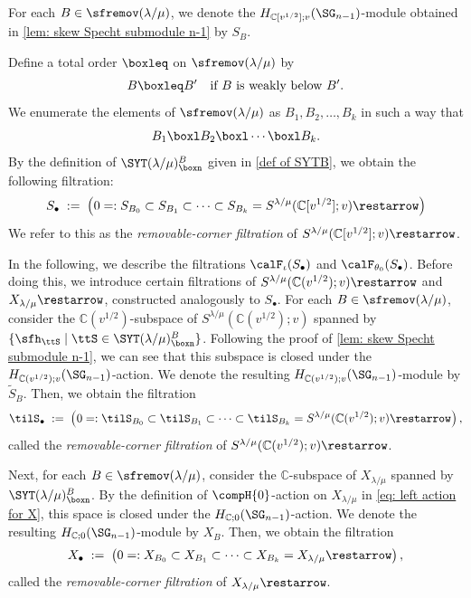 \documentclass[12pt, reqno]{amsart}
\theoremstyle{plain}
\theoremstyle{definition}
\numberwithin{equation}{section}
\numberwithin{figure}{section}
\numberwithin{table}{section}
\def\C{\mathbb C}
\begin{document}
For each $B \in \sfremov(\lambda/\mu)$, we denote the
$H_{\C[v^{1/2}];v}(\SG_{n-1})$-module obtained in
\cref{lem: skew Specht submodule n-1} by
$S_B$. 







Define a total order $\boxleq$ on $\sfremov(\lambda/\mu)$ by
\begin{align}\label{eq: total order condition}
B \boxleq B' \quad \text{if $B$ is weakly below $B'$.}
\end{align}
We enumerate the elements of $\sfremov(\lambda/\mu)$ as $B_1,B_2,\ldots,B_k$ in such a way that
\[
B_1 \boxl B_2 \boxl \cdots \boxl B_k .
\]
By the definition of $\SYT(\lambda/\mu)^B_{\boxn}$ given in \cref{def of SYTB}, we obtain the following filtration:
\begin{align}\label{eq: first remov filt}
S_{\bullet} \; := \;\left(
0 =:S_{B_0} \subset S_{B_1} \subset \cdots 
\subset S_{B_k} = S^{\lambda/\mu}(\C[v^{1/2}];v)\restarrow\right)
\end{align}
We refer to this as the \emph{removable-corner filtration} of $S^{\lambda/\mu}(\C[v^{1/2}];v)\restarrow$.




In the following, we describe 
the filtrations 
$\calF_\iota(S_{\bullet})$ and $\calF_{\theta_0}(S_{\bullet})$.
Before doing this, we introduce
certain filtrations  of $S^{\lambda/\mu}(\C(v^{1/2});v) \restarrow$ and $X_{\lambda/\mu} \restarrow$, constructed analogously to $S_{\bullet}$. 
For each $B \in \sfremov(\lambda/\mu)$, consider the $\C(v^{1/2})$-subspace of $S^{\lambda/\mu}(\C(v^{1/2});v)$ spanned by $\{\sfh_{\ttS} \mid \ttS \in \SYT(\lambda/\mu)^B_{\boxn} \}$.
Following the proof of \cref{lem: skew Specht submodule n-1}, we can see that this subspace  is closed under the $H_{\C(v^{1/2});v}(\SG_{n-1})$-action.
We denote the  resulting $H_{\C(v^{1/2});v}(\SG_{n-1})$-module
 by $\widetilde{S}_B$.
Then, we obtain the filtration
\begin{align}\label{eq: first remov filt}
\tilS_{\bullet} \; := \;\left(
0 =:\tilS_{B_0} \subset \tilS_{B_1} \subset \cdots 
\subset \tilS_{B_k} = S^{\lambda/\mu}(\C(v^{1/2});v)\restarrow\right),
\end{align}
called the
\emph{removable-corner filtration} of $S^{\lambda/\mu}(\C(v^{1/2});v)\restarrow$.

Next, for each $B \in \sfremov(\lambda/\mu)$,  consider the $\C$-subspace of $X_{\lambda/\mu}$ spanned by $\SYT(\lambda/\mu)^{B}_{\boxn}$.
By the definition of $\compH{0}$-action on $X_{\lambda/\mu}$ in \cref{eq: left action for X}, 
this space is closed under the $H_{\C;0}(\SG_{n-1})$-action.
We denote the  resulting $H_{\C;0}(\SG_{n-1})$-module
 by $X_B$.
Then, we obtain the filtration
\begin{align}\label{eq: first remov filt}
X_{\bullet} \; := \;\left(
0 =:X_{B_0} \subset X_{B_1} \subset \cdots 
\subset X_{B_k} = X_{\lambda/\mu}\restarrow\right),
\end{align}
called the
\emph{removable-corner filtration} of $X_{\lambda/\mu}\restarrow$.
\end{document}
